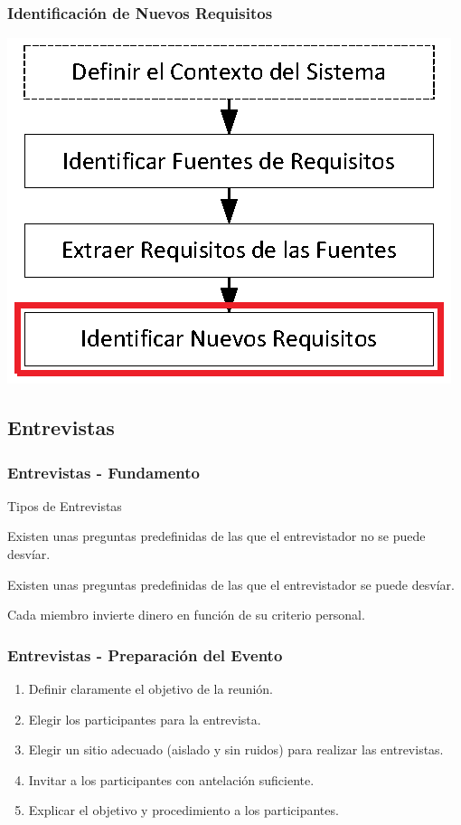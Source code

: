 \documentclass[handout,a4paper,slidestop,xcolor=pst,dvips,blue]{beamer}
\begin{document}
\begin{frame}[c]
	\frametitle{Identificación de Nuevos Requisitos}
	\begin{center}
		\includegraphics[width=0.75\linewidth]{images/proceso/requisitosNuevos.eps}
	\end{center}
\end{frame}

\subsection{Entrevistas}

\begin{frame}[t]
    \frametitle{Entrevistas - Fundamento}
    \begin{block}{Tipos de Entrevistas}
        \begin{description}[<+->]
            \item[Estandarizada] Existen unas preguntas predefinidas de las que el entrevistador no se puede desvíar.
            \item[Exploratoria] Existen unas preguntas predefinidas de las que el entrevistador se puede desvíar.
            \item[No estructurada] Cada miembro invierte dinero en función de su criterio personal.
        \end{description}
    \end{block}
\end{frame}

\begin{frame}[c]
    \frametitle{Entrevistas - Preparación del Evento}
    \begin{enumerate}[<+->]
        \item Definir claramente el objetivo de la reunión.
        \item Elegir los participantes para la entrevista.
        \item Elegir un sitio adecuado (aislado y sin ruidos) para realizar las entrevistas.
        \item Invitar a los participantes con antelación suficiente.
        \item Explicar el objetivo y procedimiento a los participantes.
    \end{enumerate}
\end{frame}
\end{document}
